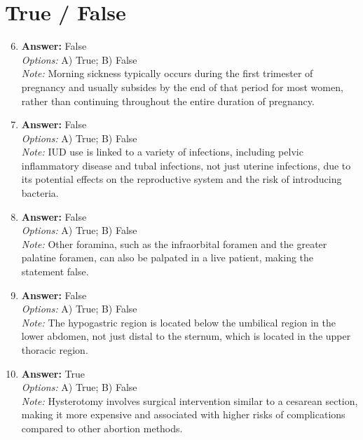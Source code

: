 \documentclass[12pt]{article}
\begin{document}
\section*{True / False}
\begin{enumerate}[label=\arabic*.]
\setcounter{enumi}{5}
\item \textbf{Answer:} False
\\ \textit{Options:} A) True; B) False
\\ \textit{Note:} Morning sickness typically occurs during the first trimester of pregnancy and usually subsides by the end of that period for most women, rather than continuing throughout the entire duration of pregnancy.
\item \textbf{Answer:} False
\\ \textit{Options:} A) True; B) False
\\ \textit{Note:} IUD use is linked to a variety of infections, including pelvic inflammatory disease and tubal infections, not just uterine infections, due to its potential effects on the reproductive system and the risk of introducing bacteria.
\item \textbf{Answer:} False
\\ \textit{Options:} A) True; B) False
\\ \textit{Note:} Other foramina, such as the infraorbital foramen and the greater palatine foramen, can also be palpated in a live patient, making the statement false.
\item \textbf{Answer:} False
\\ \textit{Options:} A) True; B) False
\\ \textit{Note:} The hypogastric region is located below the umbilical region in the lower abdomen, not just distal to the sternum, which is located in the upper thoracic region.
\item \textbf{Answer:} True
\\ \textit{Options:} A) True; B) False
\\ \textit{Note:} Hysterotomy involves surgical intervention similar to a cesarean section, making it more expensive and associated with higher risks of complications compared to other abortion methods.
\end{enumerate}
\end{document}
